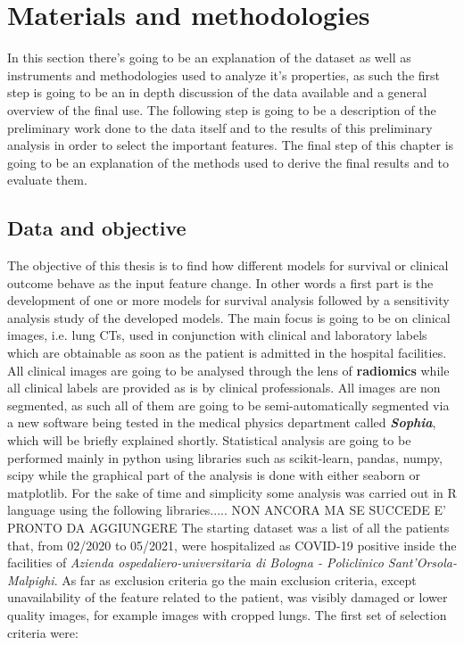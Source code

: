 \chapter{Materials and methodologies}
In this section there's going to be an explanation of the dataset as well as instruments and methodologies used to analyze it's properties, as such the first step is going to be an in depth discussion of the data available and a general overview of the final use. The following step is going to be a description of the preliminary work done to the data itself and to the results of this preliminary analysis in order to select the important features. The final step of this chapter is going to be an explanation of the methods used to derive the final results and to evaluate them.

\section{Data and objective}
\label{chap:freefree}
The objective of this thesis is to find how different models for survival or clinical outcome behave as the input feature change. In other words a first part is the development of one or more models for survival analysis followed by a sensitivity analysis study of the developed models. The main focus is going to be on clinical images, i.e. lung CTs, used in conjunction with clinical and laboratory labels which are obtainable as soon as the patient is admitted in the hospital facilities. All clinical images are going to be analysed through the lens of \textbf{radiomics} while all clinical labels are provided as is by clinical professionals.
All images are non segmented, as such all of them are going to be semi-automatically segmented via a new software being tested in the medical physics department called \textit{\textbf{Sophia}}, which will be briefly explained shortly. Statistical analysis are going to be performed mainly in python using libraries such as scikit-learn, pandas, numpy, scipy while the graphical part of the analysis is done with either seaborn or matplotlib. \large{For the sake of time and simplicity some analysis was carried out in R language using the following libraries..... NON ANCORA MA SE SUCCEDE E' PRONTO DA AGGIUNGERE}
The starting dataset was a list of all the patients that, from 02/2020 to 05/2021, were hospitalized as COVID-19 positive inside the facilities of \textit{Azienda ospedaliero-universitaria di Bologna - Policlinico Sant'Orsola-Malpighi}. As far as exclusion criteria go the main exclusion criteria, except unavailability of the feature related to the patient, was visibly damaged or lower quality images, for example images with cropped lungs. The first set of selection criteria were:

